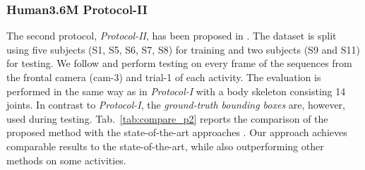 \documentclass[10pt,journal,compsoc]{IEEEtran}
\begin{document}
\subsubsection{Human3.6M Protocol-II} 
The second protocol, \emph{Protocol-II}, has been proposed in \cite{bogo2016keep}. The dataset is split using five subjects (S1, S5, S6, S7, S8)
for training and two subjects (S9 and S11) for testing. We follow \cite{lassner2017unite} and perform testing
on every  frame of the sequences from the frontal camera (cam-3) and trial-1 of each activity. 
The evaluation is performed in the same way as in \emph{Protocol-I} with a body skeleton consisting 14 joints. 
In contrast to \emph{Protocol-I}, the \emph{ground-truth bounding boxes} are, however, used during testing. 
Tab.~\ref{tab:compare_p2} reports the comparison of the proposed method with the state-of-the-art approaches 
\cite{Akhter:CVPR:2015, Ramakrishna_2012, zhou2015sparse, bogo2016keep, lassner2017unite, tome2017lifting, Moreno_arxiv2016}.
Our approach achieves comparable results to the state-of-the-art, while also outperforming other methods on some 
activities.    \\
\end{document}
